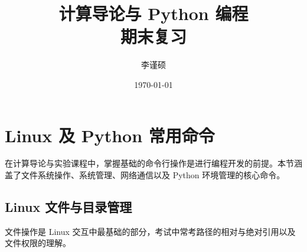 \documentclass[12pt, a4paper]{article}
\begin{document}
\title{\Huge \textbf{计算导论与 Python 编程}\\ \LARGE 期末复习}
\author{李谨硕}
\date{\today}

\maketitle
\tableofcontents

\newpage

\section{Linux 及 Python 常用命令}

在计算导论与实验课程中，掌握基础的命令行操作是进行编程开发的前提。本节涵盖了文件系统操作、系统管理、网络通信以及 Python 环境管理的核心命令。

\subsection{Linux 文件与目录管理}

文件操作是 Linux 交互中最基础的部分，考试中常考路径的相对与绝对引用以及文件权限的理解。
\end{document}
